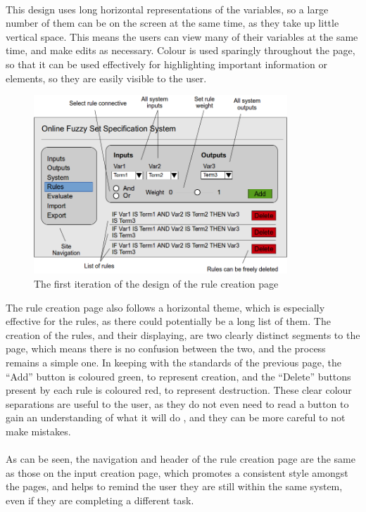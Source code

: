 \ \\
This design uses long horizontal representations of the variables, so a large number of them can be on the screen at the same time, as they take up little vertical space. This means the users can view many of their variables at the same time, and make edits as necessary. Colour is used sparingly throughout the page, so that it can be used effectively for highlighting important information or elements, so they are easily visible to the user.

\begin{figure}[ht!]	
\begin{center}
\includegraphics[width=0.85\textwidth]{images/firstItRules}
\end{center}
\vspace{-5mm}	
\caption{The first iteration of the design of the rule creation page}
\label{fig:design-firstIterationRules}
\end{figure}
\noindent 
The rule creation page also follows a horizontal theme, which is especially effective for the rules, as there could potentially be a long list of them. The creation of the rules, and their displaying, are two clearly distinct segments to the page, which means there is no confusion between the two, and the process remains a simple one. In keeping with the standards of the previous page, the ``Add'' button is coloured green, to represent creation, and the ``Delete'' buttons present by each rule is coloured red, to represent destruction. These clear colour separations are useful to the user, as they do not even need to read a button to gain an understanding of what it will do \cite{cyr2010colour}, and they can be more careful to not make mistakes.\ \\
\ \\
As can be seen, the navigation and header of the rule creation page are the same as those on the input creation page, which promotes a consistent style amongst the pages, and helps to remind the user they are still within the same system, even if they are completing a different task. 


